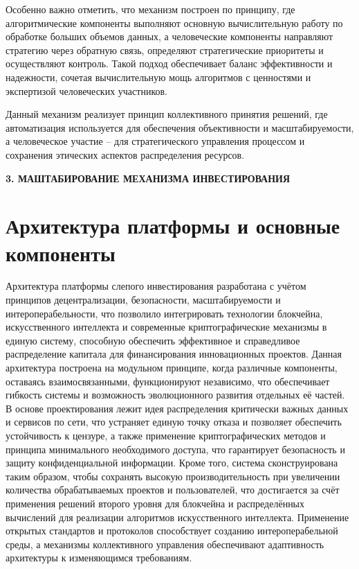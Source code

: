 \documentclass[
    candidate, %
    subf, %
    dotsinheaders=false,
]{disser}
\begin{document}
  Особенно важно отметить, что механизм построен по принципу, где алгоритмические компоненты выполняют основную вычислительную работу по обработке больших объемов данных, а человеческие компоненты направляют стратегию через обратную связь, определяют стратегические приоритеты и осуществляют контроль. Такой подход обеспечивает баланс эффективности и надежности, сочетая вычислительную мощь алгоритмов с ценностями и экспертизой человеческих участников.

  Данный механизм реализует принцип коллективного принятия решений, где автоматизация используется для обеспечения объективности и масштабируемости, а человеческое участие – для стратегического управления процессом и сохранения этических аспектов распределения ресурсов.

  \newpage
  \begin{center}
  \textbf{3. МАШТАБИРОВАНИЕ МЕХАНИЗМА ИНВЕСТИРОВАНИЯ}
\end{center}

\section{Архитектура платформы и основные компоненты}

Архитектура платформы слепого инвестирования разработана с учётом принципов децентрализации, безопасности, масштабируемости и интероперабельности, что позволило интегрировать технологии блокчейна, искусственного интеллекта и современные криптографические механизмы в единую систему, способную обеспечить эффективное и справедливое распределение капитала для финансирования инновационных проектов. Данная архитектура построена на модульном принципе, когда различные компоненты, оставаясь взаимосвязанными, функционируют независимо, что обеспечивает гибкость системы и возможность эволюционного развития отдельных её частей. В основе проектирования лежит идея распределения критически важных данных и сервисов по сети, что устраняет единую точку отказа и позволяет обеспечить устойчивость к цензуре, а также применение криптографических методов и принципа минимального необходимого доступа, что гарантирует безопасность и защиту конфиденциальной информации. Кроме того, система сконструирована таким образом, чтобы сохранять высокую производительность при увеличении количества обрабатываемых проектов и пользователей, что достигается за счёт применения решений второго уровня для блокчейна и распределённых вычислений для реализации алгоритмов искусственного интеллекта. Применение открытых стандартов и протоколов способствует созданию интероперабельной среды, а механизмы коллективного управления обеспечивают адаптивность архитектуры к изменяющимся требованиям.
\end{document}
